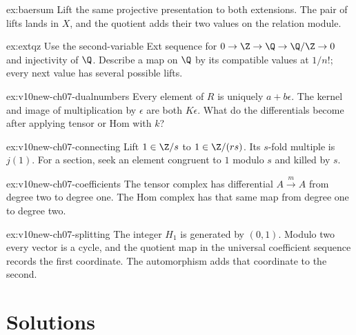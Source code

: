 \begin{hint}{ex:baersum}
Lift the same projective presentation to both extensions. The pair of lifts lands in $X$, and the quotient adds their two values on the relation module.
\end{hint}

\begin{hint}{ex:extqz}
Use the second-variable Ext sequence for $0\to\Z\to\Q\to\Q/\Z\to0$ and injectivity of $\Q$. Describe a map on $\Q$ by its compatible values at $1/n!$; every next value has several possible lifts.
\end{hint}

\begin{hint}{ex:v10new-ch07-dualnumbers}
Every element of $R$ is uniquely $a+b\epsilon$. The kernel and image of multiplication by $\epsilon$ are both $K\epsilon$. What do the differentials become after applying tensor or Hom with $k$?
\end{hint}

\begin{hint}{ex:v10new-ch07-connecting}
Lift $1\in\Z/s$ to $1\in\Z/(rs)$. Its $s$-fold multiple is $j(1)$. For a section, seek an element congruent to $1$ modulo $s$ and killed by $s$.
\end{hint}

\begin{hint}{ex:v10new-ch07-coefficients}
The tensor complex has differential $A\xrightarrow{m}A$ from degree two to degree one. The Hom complex has that same map from degree one to degree two.
\end{hint}

\begin{hint}{ex:v10new-ch07-splitting}
The integer $H_1$ is generated by $(0,1)$. Modulo two every vector is a cycle, and the quotient map in the universal coefficient sequence records the first coordinate. The automorphism adds that coordinate to the second.
\end{hint}

\section{Solutions}

